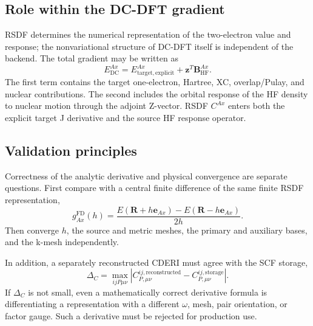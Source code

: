 \subsection{Role within the DC-DFT gradient}

RSDF determines the numerical representation of the two-electron value and
response; the nonvariational structure of DC-DFT itself is independent of the
backend.  The total gradient may be written as
\begin{equation}
  E_{\mathrm{DC}}^{Ax}
  =E_{\mathrm{target,explicit}}^{Ax}
  +\mathbf z^T\mathbf B_{\mathrm{HF}}^{Ax}.
  \label{eq:dc-rsdf-total}
\end{equation}
The first term contains the target one-electron, Hartree, XC, overlap/Pulay,
and nuclear contributions.  The second includes the orbital response of the HF
density to nuclear motion through the adjoint Z-vector.  RSDF $C^{Ax}$ enters
both the explicit target J derivative and the source HF response operator.

\subsection{Validation principles}

Correctness of the analytic derivative and physical convergence are separate
questions.  First compare with a central finite difference of the same finite
RSDF representation,
\begin{equation}
  g_{Ax}^{\mathrm{FD}}(h)
  =\frac{E(\mathbf R+h\mathbf e_{Ax})
       -E(\mathbf R-h\mathbf e_{Ax})}{2h}.
\end{equation}
Then converge $h$, the source and metric meshes, the primary and auxiliary
bases, and the k-mesh independently.

In addition, a separately reconstructed CDERI must agree with the SCF storage,
\begin{equation}
  \Delta_C=\max_{ijP\mu\nu}
  \left|C_{P,\mu\nu}^{ij,\mathrm{reconstructed}}
  -C_{P,\mu\nu}^{ij,\mathrm{storage}}\right|.
\end{equation}
If $\Delta_C$ is not small, even a mathematically correct derivative formula
is differentiating a representation with a different $\omega$, mesh, pair
orientation, or factor gauge.  Such a derivative must be rejected for
production use.
